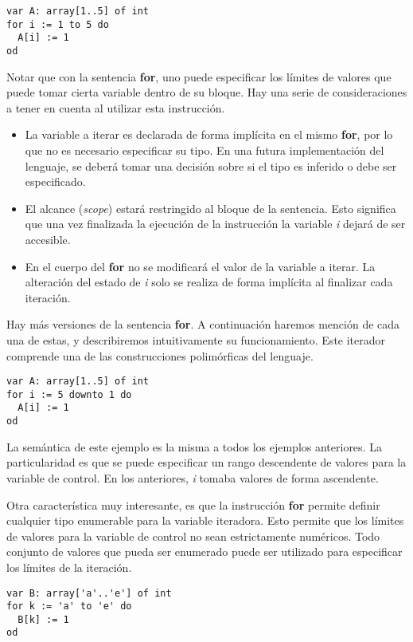 \documentclass{article}
\begin{document}
\begin{lstlisting}
var A: array[1..5] of int
for i := 1 to 5 do
  A[i] := 1
od
\end{lstlisting}

Notar que con la sentencia \textbf{for}, uno puede especificar los límites de valores que puede tomar cierta variable dentro de su bloque.
Hay una serie de consideraciones a tener en cuenta al utilizar esta instrucción.

\begin{itemize}
\item La variable a iterar es declarada de forma implícita en el mismo \textbf{for}, por lo que no es necesario especificar su tipo.
En una futura implementación del lenguaje, se deberá tomar una decisión sobre si el tipo es inferido o debe ser especificado.
\item El alcance (\textit{scope}) estará restringido al bloque de la sentencia.
Esto significa que una vez finalizada la ejecución de la instrucción la variable \textit{i} dejará de ser accesible.
\item En el cuerpo del \textbf{for} no se modificará el valor de la variable a iterar.
La alteración del estado de \textit{i} solo se realiza de forma implícita al finalizar cada iteración.
\end{itemize}

Hay más versiones de la sentencia \textbf{for}.
A continuación haremos mención de cada una de estas, y describiremos intuitivamente su funcionamiento.
Este iterador comprende una de las construcciones polimórficas del lenguaje.

\begin{lstlisting}
var A: array[1..5] of int
for i := 5 downto 1 do
  A[i] := 1
od
\end{lstlisting}

La semántica de este ejemplo es la misma a todos los ejemplos anteriores.
La particularidad es que se puede especificar un rango descendente de valores para la variable de control.
En los anteriores, \textit{i} tomaba valores de forma ascendente.

Otra característica muy interesante, es que la instrucción \textbf{for} permite definir cualquier tipo enumerable para la variable iteradora.
Esto permite que los límites de valores para la variable de control no sean estrictamente numéricos.
Todo conjunto de valores que pueda ser enumerado puede ser utilizado para especificar los límites de la iteración.

\begin{lstlisting}
var B: array['a'..'e'] of int
for k := 'a' to 'e' do
  B[k] := 1
od
\end{lstlisting}
\end{document}
